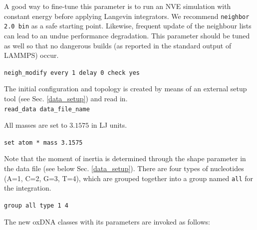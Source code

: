 \documentclass[12pt,onecolumn]{article}
\begin{document}
\noindent A good way to fine-tune this parameter is to run an NVE simulation with constant energy before applying Langevin integrators.
We recommend \texttt{neighbor 2.0 bin} as a safe starting point. Likewise, frequent update of the neighbour lists can lead to an undue performance degradation. This parameter should be tuned 
as well so that no dangerous builds (as reported in the standard output of LAMMPS) occur.

\smallskip
\texttt{neigh\_modify every 1 delay 0 check yes}\\
\smallskip

\noindent The initial configuration and topology is created by means of an external setup tool (see Sec. \ref{data_setup}) and read in.\\

\smallskip
\texttt{read\_data data\_file\_name}
\smallskip

\noindent All masses are set to $3.1575$ in LJ units.

\smallskip
\texttt{set atom * mass 3.1575}
\smallskip

\noindent Note that the moment of inertia is determined through the shape parameter in the data file (see below Sec. \ref{data_setup}). 
There are four types of nucleotides (A=1, C=2, G=3, T=4), which are grouped together into a group named \texttt{all} for the integration. 

\smallskip
\texttt{group all type 1 4}
\smallskip

\noindent The new oxDNA classes with its parameters are invoked as follows:
\end{document}
